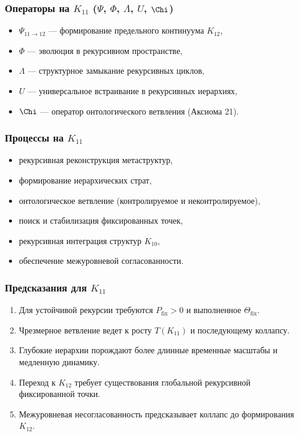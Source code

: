 \subsubsection{Операторы на $K_{11}$ ($\Psi$, $\Phi$, $\Lambda$, $U$, $\Chi$)}

\begin{itemize}
    \item $\Psi_{11\to12}$ — формирование предельного континуума $K_{12}$,
    \item $\Phi$ — эволюция в рекурсивном пространстве,
    \item $\Lambda$ — структурное замыкание рекурсивных циклов,
    \item $U$ — универсальное встраивание в рекурсивных иерархиях,
    \item $\Chi$ — оператор онтологического ветвления (Аксиома 21).
\end{itemize}

\subsubsection{Процессы на $K_{11}$}

\begin{itemize}
    \item рекурсивная реконструкция метаструктур,
    \item формирование иерархических страт,
    \item онтологическое ветвление (контролируемое и неконтролируемое),
    \item поиск и стабилизация фиксированных точек,
    \item рекурсивная интеграция структур $K_{10}$,
    \item обеспечение межуровневой согласованности.
\end{itemize}

\subsubsection{Предсказания для $K_{11}$}

\begin{enumerate}
    \item Для устойчивой рекурсии требуются $P_{\mathrm{fix}}>0$ и выполненное $\Theta_{\mathrm{fix}}$.
    \item Чрезмерное ветвление ведет к росту $T(K_{11})$ и последующему коллапсу.
    \item Глубокие иерархии порождают более длинные временные масштабы и медленную динамику.
    \item Переход к $K_{12}$ требует существования глобальной рекурсивной фиксированной точки.
    \item Межуровневая несогласованность предсказывает коллапс до формирования $K_{12}$.
\end{enumerate}

